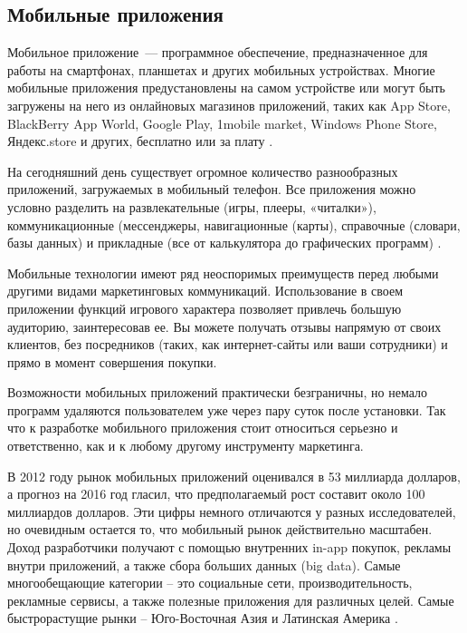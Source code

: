 \subsection{Мобильные приложения}
\label{sec:subject:mobile}

Мобильное приложение~--- программное обеспечение, предназначенное для работы на смартфонах, планшетах и других мобильных устройствах. Многие мобильные приложения предустановлены на самом устройстве или могут быть загружены на него из онлайновых магазинов приложений, таких как App Store, BlackBerry App World, Google Play, 1mobile market, Windows Phone Store, Яндекс.store и других, бесплатно или за плату \cite{wiki_mobile_def}.

На сегодняшний день существует огромное количество разнообразных приложений, загружаемых в мобильный телефон. Все приложения можно условно разделить на развлекательные (игры, плееры, «читалки»), коммуникационные (мессенджеры, навигационные (карты), справочные (словари, базы данных) и прикладные (все от калькулятора до графических программ) \cite{mobile_business}.

Мобильные технологии имеют ряд неоспоримых преимуществ перед любыми другими видами маркетинговых коммуникаций. Использование в своем приложении функций игрового характера позволяет привлечь большую аудиторию, заинтересовав ее. Вы можете получать отзывы напрямую от своих клиентов, без посредников (таких, как интернет-сайты или ваши сотрудники) и прямо в момент совершения покупки.

Возможности мобильных приложений практически безграничны, но немало программ удаляются пользователем уже через пару суток после установки. Так что к разработке мобильного приложения стоит относиться серьезно и ответственно, как и к любому другому инструменту маркетинга.

В 2012 году рынок мобильных приложений оценивался в 53 миллиарда долларов, а прогноз на 2016 год гласил, что предполагаемый рост составит около 100 миллиардов долларов. Эти цифры немного отличаются у разных исследователей, но очевидным остается то, что мобильный рынок действительно масштабен. Доход разработчики получают с помощью внутренних in-app покупок, рекламы внутри приложений, а также сбора больших данных (big data). Самые многообещающие категории – это социальные сети, производительность, рекламные сервисы, а также полезные приложения для различных целей. Самые быстрорастущие рынки – Юго-Восточная Азия и Латинская Америка \cite{mobile_market}.

